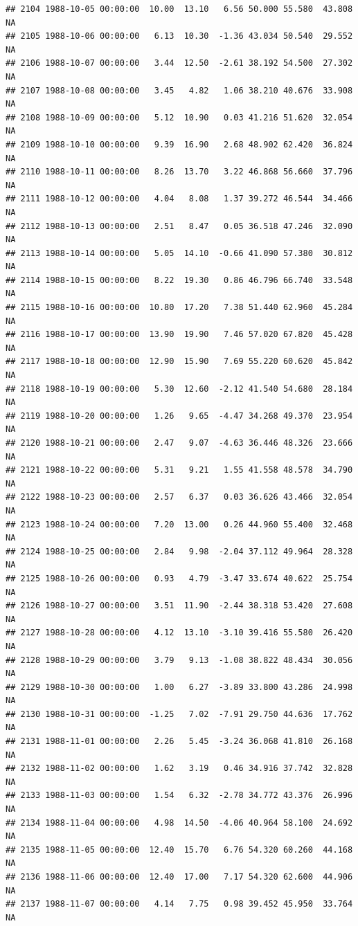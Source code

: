 \documentclass{article}\usepackage{graphicx, color}
\makeatletter
\newenvironment{kframe}{%
 \def\at@end@of@kframe{}%
 \ifinner\ifhmode%
  \def\at@end@of@kframe{\end{minipage}}%
  \begin{minipage}{\columnwidth}%
 \fi\fi%
 \def\FrameCommand##1{\hskip\@totalleftmargin \hskip-\fboxsep
 \colorbox{shadecolor}{##1}\hskip-\fboxsep
     \hskip-\linewidth \hskip-\@totalleftmargin \hskip\columnwidth}%
 \MakeFramed {\advance\hsize-\width
   \@totalleftmargin\z@ \linewidth\hsize
   \@setminipage}}%
 {\par\unskip\endMakeFramed%
 \at@end@of@kframe}
\newenvironment{knitrout}{}{} %
\makeatother
\begin{document}
\begin{knitrout}
\begin{kframe}
\begin{verbatim}
## 2104 1988-10-05 00:00:00  10.00  13.10   6.56 50.000 55.580  43.808     NA
## 2105 1988-10-06 00:00:00   6.13  10.30  -1.36 43.034 50.540  29.552     NA
## 2106 1988-10-07 00:00:00   3.44  12.50  -2.61 38.192 54.500  27.302     NA
## 2107 1988-10-08 00:00:00   3.45   4.82   1.06 38.210 40.676  33.908     NA
## 2108 1988-10-09 00:00:00   5.12  10.90   0.03 41.216 51.620  32.054     NA
## 2109 1988-10-10 00:00:00   9.39  16.90   2.68 48.902 62.420  36.824     NA
## 2110 1988-10-11 00:00:00   8.26  13.70   3.22 46.868 56.660  37.796     NA
## 2111 1988-10-12 00:00:00   4.04   8.08   1.37 39.272 46.544  34.466     NA
## 2112 1988-10-13 00:00:00   2.51   8.47   0.05 36.518 47.246  32.090     NA
## 2113 1988-10-14 00:00:00   5.05  14.10  -0.66 41.090 57.380  30.812     NA
## 2114 1988-10-15 00:00:00   8.22  19.30   0.86 46.796 66.740  33.548     NA
## 2115 1988-10-16 00:00:00  10.80  17.20   7.38 51.440 62.960  45.284     NA
## 2116 1988-10-17 00:00:00  13.90  19.90   7.46 57.020 67.820  45.428     NA
## 2117 1988-10-18 00:00:00  12.90  15.90   7.69 55.220 60.620  45.842     NA
## 2118 1988-10-19 00:00:00   5.30  12.60  -2.12 41.540 54.680  28.184     NA
## 2119 1988-10-20 00:00:00   1.26   9.65  -4.47 34.268 49.370  23.954     NA
## 2120 1988-10-21 00:00:00   2.47   9.07  -4.63 36.446 48.326  23.666     NA
## 2121 1988-10-22 00:00:00   5.31   9.21   1.55 41.558 48.578  34.790     NA
## 2122 1988-10-23 00:00:00   2.57   6.37   0.03 36.626 43.466  32.054     NA
## 2123 1988-10-24 00:00:00   7.20  13.00   0.26 44.960 55.400  32.468     NA
## 2124 1988-10-25 00:00:00   2.84   9.98  -2.04 37.112 49.964  28.328     NA
## 2125 1988-10-26 00:00:00   0.93   4.79  -3.47 33.674 40.622  25.754     NA
## 2126 1988-10-27 00:00:00   3.51  11.90  -2.44 38.318 53.420  27.608     NA
## 2127 1988-10-28 00:00:00   4.12  13.10  -3.10 39.416 55.580  26.420     NA
## 2128 1988-10-29 00:00:00   3.79   9.13  -1.08 38.822 48.434  30.056     NA
## 2129 1988-10-30 00:00:00   1.00   6.27  -3.89 33.800 43.286  24.998     NA
## 2130 1988-10-31 00:00:00  -1.25   7.02  -7.91 29.750 44.636  17.762     NA
## 2131 1988-11-01 00:00:00   2.26   5.45  -3.24 36.068 41.810  26.168     NA
## 2132 1988-11-02 00:00:00   1.62   3.19   0.46 34.916 37.742  32.828     NA
## 2133 1988-11-03 00:00:00   1.54   6.32  -2.78 34.772 43.376  26.996     NA
## 2134 1988-11-04 00:00:00   4.98  14.50  -4.06 40.964 58.100  24.692     NA
## 2135 1988-11-05 00:00:00  12.40  15.70   6.76 54.320 60.260  44.168     NA
## 2136 1988-11-06 00:00:00  12.40  17.00   7.17 54.320 62.600  44.906     NA
## 2137 1988-11-07 00:00:00   4.14   7.75   0.98 39.452 45.950  33.764     NA

\end{verbatim}
\end{kframe}
\end{knitrout}
\end{document}
